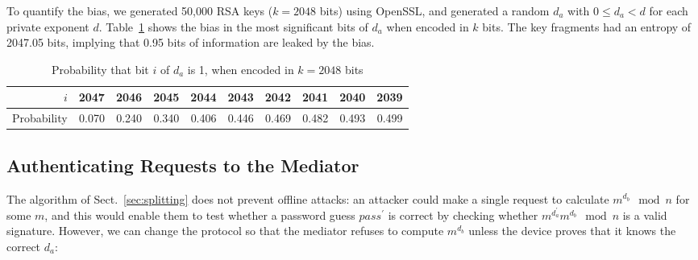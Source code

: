 \documentclass{llncs}
\begin{document}
To quantify the bias, we generated 50,000 RSA keys ($k=2048$ bits) using OpenSSL, and generated a
random $d_a$ with $0 \le d_a < d$ for each private exponent $d$. Table~\ref{tab:bias} shows the bias
in the most significant bits of $d_a$ when encoded in $k$ bits. The key fragments had an entropy of
2047.05 bits, implying that 0.95 bits of information are leaked by the bias.

\renewcommand{\arraystretch}{1.5}
\setlength\tabcolsep{4pt}
\begin{table}
\centering
\caption{Probability that bit $i$ of $d_a$ is 1, when encoded in $k=2048$ bits}\label{tab:bias}
\begin{tabular}{r|rrrrrrrrr}
$i$ & 2047 & 2046 & 2045 & 2044 & 2043 & 2042 & 2041 & 2040 & 2039 \\ \hline
Probability &
0.070 & 0.240 & 0.340 & 0.406 & 0.446 & 0.469 & 0.482 & 0.493 & 0.499
\end{tabular}
\end{table}

\subsection{Authenticating Requests to the Mediator}\label{sec:mediator-auth}

The algorithm of Sect.~\ref{sec:splitting} does not prevent offline attacks: an attacker could make
a single request to calculate $m^{d_b} \mod n$ for some $m$, and this would enable them to test
whether a password guess $\mathit{pass}^\prime$ is correct by checking whether
$m^{d_a^\prime} m^{d_b} \mod n$ is a valid signature. However, we can change the protocol so that
the mediator refuses to compute $m^{d_b}$ unless the device proves that it knows the correct $d_a$:
\end{document}
